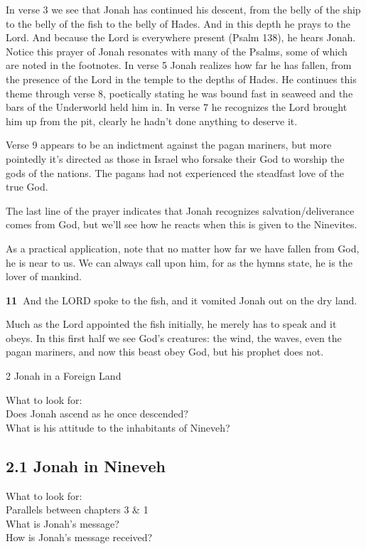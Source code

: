 \documentclass[
]{article}
\begin{document}
In verse 3 we see that Jonah has continued his descent, from the belly
of the ship to the belly of the fish to the belly of Hades. And in this
depth he prays to the Lord. And because the Lord is everywhere present
(Psalm 138), he hears Jonah. Notice this prayer of Jonah resonates with
many of the Psalms, some of which are noted in the footnotes. In verse 5
Jonah realizes how far he has fallen, from the presence of the Lord in
the temple to the depths of Hades. He continues this theme through verse
8, poetically stating he was bound fast in seaweed and the bars of the
Underworld held him in. In verse 7 he recognizes the Lord brought him up
from the pit, clearly he hadn't done anything to deserve it.

Verse 9 appears to be an indictment against the pagan mariners, but more
pointedly it's directed as those in Israel who forsake their God to
worship the gods of the nations. The pagans had not experienced the
steadfast love of the true God.

The last line of the prayer indicates that Jonah recognizes
salvation/deliverance comes from God, but we'll see how he reacts when
this is given to the Ninevites.

As a practical application, note that no matter how far we have fallen
from God, he is near to us. We can always call upon him, for as the
hymns state, he is the lover of mankind.

\textbf{11~}And the LORD spoke to the fish, and it vomited Jonah out on
the dry land.

Much as the Lord appointed the fish initially, he merely has to speak
and it obeys. In this first half we see God's creatures: the wind, the
waves, even the pagan mariners, and now this beast obey God, but his
prophet does not.

2 Jonah in a Foreign Land

What to look for:\\
Does Jonah ascend as he once descended?\\
What is his attitude to the inhabitants of Nineveh?

\subsection{2.1 Jonah in Nineveh}\label{jonah-in-nineveh}

What to look for:\\
Parallels between chapters 3 \& 1\\
What is Jonah's message?\\
How is Jonah's message received?
\end{document}
